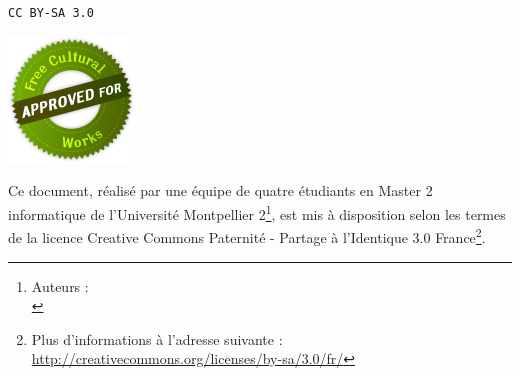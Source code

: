\chapter*{}
\begin{center}
\texttt{\LARGE CC BY-SA 3.0}

\includegraphics[scale=0.8]{files/free}

Ce document, réalisé par une équipe de quatre étudiants en Master 2 informatique de l'Université Montpellier 2\footnote{Auteurs :\\ \auteurs}, est mis à disposition selon les termes de la licence Creative Commons Paternité - Partage à l'Identique 3.0 France\footnote{Plus d'informations à l'adresse suivante : \href{http://creativecommons.org/licenses/by-sa/3.0/fr/}{http://creativecommons.org/licenses/by-sa/3.0/fr/}}.
\end{center}
